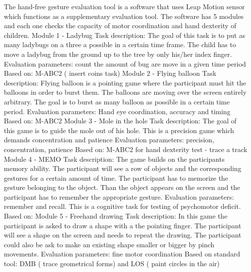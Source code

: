 The hand-free gesture evaluation tool is a software that uses Leap Motion sensor which functions as a supplementary evaluation tool. The software has 5 modules  and each one checks the capacity of motor coordination and hand dexterity of children.
\vspace{5mm} %
\hfill \break
Module 1 - Ladybug\newline
Task description: The goal of this task is to put as many ladybugs on a three a possible in a certain time frame. The child has to move a ladybug from the ground up to the tree by only his/her index finger.
Evaluation parameters: count the amount of bug are move in a given time period
Based on: M-ABC2 ( insert coins task)
\vspace{5mm} %
\hfill \break
Module 2 - Flying balloon\newline
Task description: Flying balloon is a pointing game where the participant must hit the balloons in order to burst them. The balloons are moving over the screen entirely arbitrary. The goal is to burst as many balloon as possible in a certain time period.
Evaluation parameters: Hand eye coordination, accuracy and timing
Based on: M-ABC2 
\vspace{5mm} %
\hfill \break
Module 3 - Mole in the hole\newline
Task description: The goal of this game is to guide the mole out of his hole. This is a precision game which demands concentration and patience 
Evaluation parameters:  precision, concentration, patience 
Based on: M-ABC2 for hand dexterity test - trace a track
\vspace{5mm} %
\hfill \break
Module 4 - MEMO \newline
Task description: The game builds on the participants memory ability.  The participant will see a row of objects and the corresponding gestures for a certain amount of time. The participant has to memorize the gesture belonging to the object. Than the object appears on the screen and the participant has to remember the appropriate gesture. 
Evaluation parameters: remember and recall. This is a cognitive task for testing of psychomotor deficit.
Based on:
\vspace{5mm} %
\hfill \break
Module 5 - Freehand drawing\newline
Task description: In this game the participant is asked to draw a shape with a the pointing finger.  The participant will see a shape on the screen and needs to repeat the drawing. The participant could also be ask to make an existing shape smaller or bigger by pinch movements.
Evaluation parameters: fine motor coordination
Based on standard tool: DMB ( trace geometrical forms) and LOS ( paint circles in the air)

